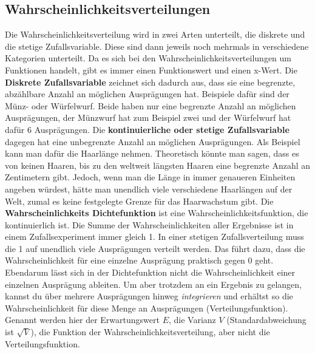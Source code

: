 \documentclass[letterpaper, titlepage]{article}
\begin{document}
\subsection{Wahrscheinlichkeitsverteilungen}\label{Wahrscheinlichkeitsverteilungen} Die Wahrscheinlichkeitsverteilung wird in zwei Arten unterteilt, die diskrete und die stetige Zufallsvariable. Diese sind dann jeweils noch mehrmals in verschiedene Kategorien unterteilt. Da es sich bei den Wahrscheinlichkeitsverteilungen um Funktionen handelt, gibt es immer einen Funktionswert und einen x-Wert.
Die \textbf{Diskrete Zufallsvariable} zeichnet sich dadurch aus, dass sie eine begrenzte, abzählbare Anzahl an möglichen Ausprägungen hat. Beispiele dafür sind der Münz- oder Würfelwurf. Beide haben nur eine begrenzte Anzahl an möglichen Ausprägungen, der Münzwurf hat zum Beispiel zwei und der Würfelwurf hat dafür 6 Ausprägungen. Die \textbf{kontinuierliche oder stetige Zufallsvariable} dagegen hat eine unbegrenzte Anzahl an möglichen Ausprägungen. Als Beispiel kann man dafür die Haarlänge nehmen. Theoretisch könnte man sagen, dass es von keinen Haaren, bis zu den weltweit längsten Haaren eine begrenzte Anzahl an Zentimetern gibt. Jedoch, wenn man die Länge in immer genaueren Einheiten angeben würdest, hätte man unendlich viele verschiedene Haarlängen auf der Welt, zumal es keine festgelegte Grenze für das Haarwachstum gibt. Die \textbf{Wahrscheinlichkeits Dichtefunktion} ist eine Wahrscheinlichkeitsfunktion, die kontinuierlich ist. Die Summe der Wahrscheinlichkeiten aller Ergebnisse ist in einem Zufallsexperiment immer gleich 1. In einer stetigen Zufallsverteilung muss die 1 auf unendlich viele Ausprägungen verteilt werden. Das führt dazu, dass die Wahrscheinlichkeit für eine einzelne Ausprägung praktisch gegen 0 geht. Ebendarum lässt sich in der Dichtefunktion nicht die Wahrscheinlichkeit einer einzelnen Ausprägung ableiten. Um aber trotzdem an ein Ergebnis zu gelangen, kannst du über mehrere Ausprägungen hinweg \textit{integrieren} und erhältst so die Wahrscheinlichkeit für diese Menge an Ausprägungen (Verteilungsfunktion). Genannt werden hier der Erwartungswert $E$, die Varianz $V$ (Standardabweichung ist $\sqrt V$), die Funktion der Wahrscheinlichkeitsverteilung, aber nicht die Verteilungsfunktion.
\end{document}
